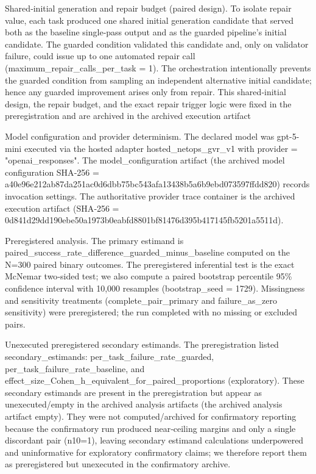 \documentclass[conference]{IEEEtran}
\begin{document}
Shared‑initial generation and repair budget (paired design). To isolate repair value, each task produced one shared initial generation candidate that served both as the baseline single‑pass output and as the guarded pipeline's initial candidate. The guarded condition validated this candidate and, only on validator failure, could issue up to one automated repair call (maximum\_repair\_calls\_per\_task = 1). The orchestration intentionally prevents the guarded condition from sampling an independent alternative initial candidate; hence any guarded improvement arises only from repair. This shared‑initial design, the repair budget, and the exact repair trigger logic were fixed in the preregistration and are archived in the archived execution artifact

Model configuration and provider determinism. The declared model was gpt-5-mini executed via the hosted adapter hosted\_netops\_gvr\_v1 with provider = "openai\_responses". The model\_configuration artifact (the archived model configuration SHA‑256 = a40e96e2\allowbreak{}12ab87da\allowbreak{}251ac0d6\allowbreak{}dbb75bc5\allowbreak{}43afa134\allowbreak{}38b5a6b9\allowbreak{}ebd07359\allowbreak{}7ffdd820) records invocation settings. The authoritative provider trace container is the archived execution artifact (SHA‑256 = 0d841d29\allowbreak{}dd190ebe\allowbreak{}50a1973b\allowbreak{}0eabfd88\allowbreak{}01bf8147\allowbreak{}6d395b41\allowbreak{}7145fb52\allowbreak{}01a5511d).

Preregistered analysis. The primary estimand is paired\_success\_rate\_difference\_guarded\_minus\_baseline computed on the N=300 paired binary outcomes. The preregistered inferential test is the exact McNemar two‑sided test; we also compute a paired bootstrap percentile 95\% confidence interval with 10,000 resamples (bootstrap\_seed = 1729). Missingness and sensitivity treatments (complete\_pair\_primary and failure\_as\_zero sensitivity) were preregistered; the run completed with no missing or excluded pairs.

Unexecuted preregistered secondary estimands. The preregistration listed secondary\_estimands: per\_task\_failure\_rate\_guarded, per\_task\_failure\_rate\_baseline, and effect\_size\_Cohen\_h\_equivalent\_for\_paired\_proportions (exploratory). These secondary estimands are present in the preregistration but appear as unexecuted/empty in the archived analysis artifacts (the archived analysis artifact empty). They were not computed/archived for confirmatory reporting because the confirmatory run produced near‑ceiling margins and only a single discordant pair (n10=1), leaving secondary estimand calculations underpowered and uninformative for exploratory confirmatory claims; we therefore report them as preregistered but unexecuted in the confirmatory archive.
\end{document}

